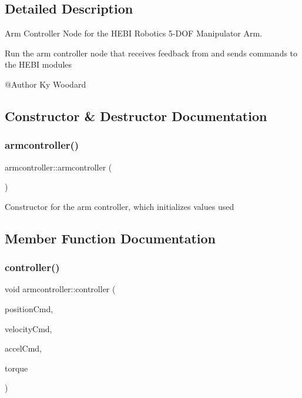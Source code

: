 \subsection{Detailed Description}
Arm Controller Node for the H\+E\+BI Robotics 5-\/\+D\+OF Manipulator Arm. 

Run the arm controller node that receives feedback from and sends commands to the H\+E\+BI modules \begin{DoxyVerb}@Author Ky Woodard\end{DoxyVerb}
 

\subsection{Constructor \& Destructor Documentation}
\mbox{\label{classarmcontroller_a7e2b5cd80851fced3e54641422fb04dd}} 
\subsubsection{\texorpdfstring{armcontroller()}{armcontroller()}}
{\footnotesize\ttfamily armcontroller\+::armcontroller (\begin{DoxyParamCaption}{ }\end{DoxyParamCaption})}

Constructor for the arm controller, which initializes values used 

\subsection{Member Function Documentation}
\mbox{\label{classarmcontroller_ab2a040d42baac477ccc328d03b8c8903}} 
\subsubsection{\texorpdfstring{controller()}{controller()}}
{\footnotesize\ttfamily void armcontroller\+::controller (\begin{DoxyParamCaption}\item[{const Eigen\+::\+Vector\+Xd \&}]{position\+Cmd,  }\item[{const Eigen\+::\+Vector\+Xd \&}]{velocity\+Cmd,  }\item[{const Eigen\+::\+Vector\+Xd \&}]{accel\+Cmd,  }\item[{std\+::vector$<$ double $>$ \&}]{torque }\end{DoxyParamCaption})}

